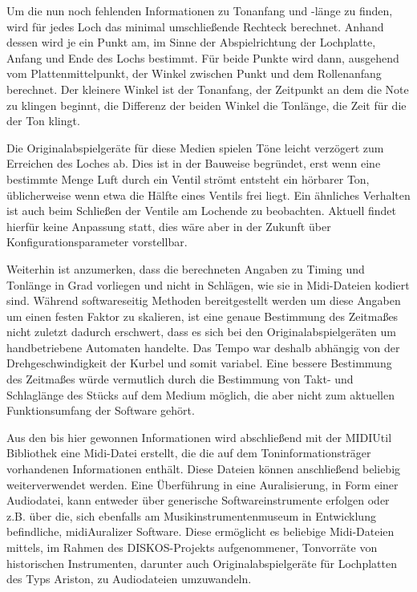 Um die nun noch fehlenden Informationen zu Tonanfang und -länge zu finden, wird für jedes Loch das minimal umschließende Rechteck berechnet.
Anhand dessen wird je ein Punkt am, im Sinne der Abspielrichtung der Lochplatte, Anfang und Ende des Lochs bestimmt.
Für beide Punkte wird dann, ausgehend vom Plattenmittelpunkt, der Winkel zwischen Punkt und dem Rollenanfang berechnet.
Der kleinere Winkel ist der Tonanfang, der Zeitpunkt an dem die Note zu klingen beginnt, die Differenz der beiden Winkel die Tonlänge, die Zeit für die der Ton klingt.

Die Originalabspielgeräte für diese Medien spielen Töne leicht verzögert zum Erreichen des Loches ab.
Dies ist in der Bauweise begründet, erst wenn eine bestimmte Menge Luft durch ein Ventil strömt entsteht ein hörbarer Ton, üblicherweise wenn etwa die Hälfte eines Ventils frei liegt.
Ein ähnliches Verhalten ist auch beim Schließen der Ventile am Lochende zu beobachten.
Aktuell findet hierfür keine Anpassung statt, dies wäre aber in der Zukunft über Konfigurationsparameter vorstellbar.

Weiterhin ist anzumerken, dass die berechneten Angaben zu Timing und Tonlänge in Grad vorliegen und nicht in Schlägen, wie sie in Midi-Dateien kodiert sind.
Während softwareseitig Methoden bereitgestellt werden um diese Angaben um einen festen Faktor zu skalieren, ist eine genaue Bestimmung des Zeitmaßes nicht zuletzt dadurch erschwert, dass es sich bei den Originalabspielgeräten um handbetriebene Automaten handelte.
Das Tempo war deshalb abhängig von der Drehgeschwindigkeit der Kurbel und somit variabel.
Eine bessere Bestimmung des Zeitmaßes würde vermutlich durch die Bestimmung von Takt- und Schlaglänge des Stücks auf dem Medium möglich, die aber nicht zum aktuellen Funktionsumfang der Software gehört.

Aus den bis hier gewonnen Informationen wird abschließend mit der MIDIUtil Bibliothek \parencite[]{midiutil} eine Midi-Datei erstellt, die die auf dem Toninformationsträger vorhandenen Informationen enthält.
Diese Dateien können anschließend beliebig weiterverwendet werden.
Eine Überführung in eine Auralisierung, in Form einer Audiodatei, kann entweder über generische Softwareinstrumente erfolgen oder z.B. über die, sich ebenfalls am Musikinstrumentenmuseum in Entwicklung befindliche, midiAuralizer \parencite[]{midiauralizer} Software.
Diese ermöglicht es beliebige Midi-Dateien mittels, im Rahmen des DISKOS-Projekts aufgenommener, Tonvorräte von historischen Instrumenten, darunter auch Originalabspielgeräte für Lochplatten des Typs Ariston, zu Audiodateien umzuwandeln.

